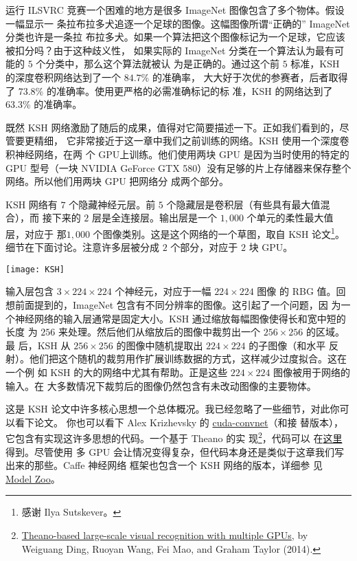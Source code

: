 运行 ILSVRC 竞赛一个困难的地方是很多 ImageNet 图像包含了多个物体。假设一幅显示一
条拉布拉多犬追逐一个足球的图像。这幅图像所谓“正确的” ImageNet 分类也许是一条拉
布拉多犬。如果一个算法把这个图像标记为一个足球，它应该被扣分吗？由于这种歧义性，
如果实际的 ImageNet 分类在一个算法认为最有可能的 $5$ 个分类中，那么这个算法就被认
为是正确的。通过这个前 $5$ 标准，KSH 的深度卷积网络达到了一个 $84.7$\% 的准确率，
大大好于次优的参赛者，后者取得了 $73.8$\% 的准确率。使用更严格的必需准确标记的标
准，KSH 的网络达到了 $63.3$\% 的准确率。

既然 KSH 网络激励了随后的成果，值得对它简要描述一下。正如我们看到的，尽管要更精细，
它非常接近于这一章中我们之前训练的网络。KSH 使用一个深度卷积神经网络，在两
个 GPU上训练。他们使用两块 GPU 是因为当时使用的特定的 GPU 型号（一块 NVIDIA
GeForce GTX 580）没有足够的片上存储器来保存整个网络。所以他们用两块 GPU 把网络分
成两个部分。

KSH 网络有 $7$ 个隐藏神经元层。前 $5$ 个隐藏层是卷积层（有些具有最大值混合），而
接下来的 $2$ 层是全连接层。输出层是一个 $1,000$ 个单元的柔性最大值层，对应于
那$1,000$ 个图像类别。这是这个网络的一个草图，取自 KSH 论文\footnote{感谢 Ilya
  Sutskever。}。细节在下面讨论。注意许多层被分成 $2$ 个部分，对应于 $2$ 块 GPU。
\begin{center}
\texttt{[image: KSH]}
\end{center}

输入层包含 $3 \times 224 \times 224$ 个神经元，对应于一幅 $224 \times 224$ 图像
的 RBG 值。回想前面提到的，ImageNet 包含有不同分辨率的图像。这引起了一个问题，因
为一个神经网络的输入层通常是固定大小。KSH 通过缩放每幅图像使得长和宽中短的长度
为 $256$ 来处理。然后他们从缩放后的图像中裁剪出一个 $256 \times 256$ 的区域。最
后，KSH 从 $256 \times 256$ 的图像中随机提取出 $224 \times 224$ 的子图像（和水平
反射）。他们把这个随机的裁剪用作扩展训练数据的方式，这样减少过度拟合。这在一个例
如 KSH 的大的网络中尤其有帮助。正是这些 $224 \times 224$ 图像被用于网络的输入。在
大多数情况下裁剪后的图像仍然包含有未改动图像的主要物体。

这是 KSH 论文中许多核心思想一个总体概况。我已经忽略了一些细节，对此你可以看下论文。
你也可以看下 Alex
Krizhevsky 的 \href{https://code.google.com/p/cuda-convnet/}{cuda-convnet}（和接
替版本），它包含有实现这许多思想的代码。一个基于 Theano 的实
现\footnote{\href{http://arxiv.org/abs/1412.2302}{Theano-based large-scale
    visual recognition with multiple GPUs}, by Weiguang Ding, Ruoyan Wang, Fei
  Mao, and Graham Taylor (2014).}，代码可以
在\href{https://github.com/uoguelph-mlrg/theano_alexnet}{这里}得到。尽管使用
多 GPU 会让情况变得复杂，但代码本身还是类似于这章我们写出来的那些。Caffe 神经网络
框架也包含一个 KSH 网络的版本，详细参
见 \href{http://caffe.berkeleyvision.org/model_zoo.html}{Model Zoo}。\\

